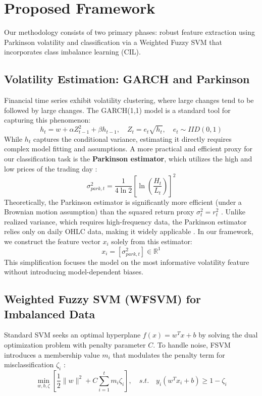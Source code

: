 \documentclass[twoside]{article}
\begin{document}
	\section{Proposed Framework}
	\label{methodology}
	Our methodology consists of two primary phases: robust feature extraction using Parkinson volatility and classification via a Weighted Fuzzy SVM that incorporates class imbalance learning (CIL).
	
	\subsection{Volatility Estimation: GARCH and Parkinson}
	Financial time series exhibit volatility clustering, where large changes tend to be followed by large changes. The GARCH(1,1) model is a standard tool for capturing this phenomenon:
	\begin{equation}
		h_t = w + \alpha Z_{t-1}^2 + \beta h_{t-1}, \quad Z_t = e_t\sqrt{h_t}, \quad e_t \sim IID(0,1)
	\end{equation}
	While $h_t$ captures the conditional variance, estimating it directly requires complex model fitting and assumptions. A more practical and efficient proxy for our classification task is the \textbf{Parkinson estimator}, which utilizes the high and low prices of the trading day \cite{Parkinson1980}:
	\begin{equation}
		\sigma_{park, t}^2 = \frac{1}{4\ln 2} \left[ \ln \left( \frac{H_t}{L_t} \right) \right]^2
	\end{equation}
	Theoretically, the Parkinson estimator is significantly more efficient (under a Brownian motion assumption) than the squared return proxy $\sigma_t^2 = r_t^2$ \cite{Molnar2016}. Unlike realized variance, which requires high-frequency data, the Parkinson estimator relies only on daily OHLC data, making it widely applicable \cite{Mapa2003}. In our framework, we construct the feature vector $x_i$ solely from this estimator:
	\begin{equation}
		x_i = [\sigma_{park, t}^2] \in \mathbb{R}^1
	\end{equation}
	This simplification focuses the model on the most informative volatility feature without introducing model-dependent biases.
	
	\subsection{Weighted Fuzzy SVM (WFSVM) for Imbalanced Data}
	Standard SVM seeks an optimal hyperplane $f(x) = w^T x + b$ by solving the dual optimization problem with penalty parameter $C$. To handle noise, FSVM introduces a membership value $m_i$ that modulates the penalty term for misclassification $\zeta_i$ \cite{Lin2004}:
	\begin{equation}
		\min_{w,b,\zeta} \left[ \frac{1}{2} \|w\|^2 + C \sum_{i=1}^t m_i \zeta_i \right], \quad s.t. \quad y_i(w^T x_i + b) \geq 1 - \zeta_i
	\end{equation}
	
\end{document}
